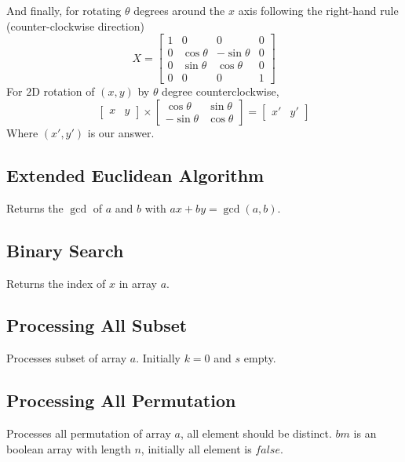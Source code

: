 \documentclass[8pt, a4paper, twocolumn]{article}
\begin{document}
And finally, for rotating $\theta$ degrees around the $x$ axis following the right-hand rule (counter-clockwise direction)
\begin{equation*}
X=\begin{bmatrix}
1 & 0 & 0 & 0\\
0 & \cos\theta & -\sin\theta & 0\\
0 & \sin\theta & \cos\theta & 0\\
0 & 0 & 0 & 1
\end{bmatrix}
\end{equation*}
For $2$D rotation of $(x,y)$ by $\theta$ degree counterclockwise,
\begin{equation*}
\begin{bmatrix}
x & y
\end{bmatrix}\times\begin{bmatrix}
\cos\theta & \sin\theta \\
-\sin\theta & \cos\theta
\end{bmatrix}=\begin{bmatrix}
x' & y'
\end{bmatrix}
\end{equation*}
Where $(x',y')$ is our answer.

\subsection{Extended Euclidean Algorithm}
Returns the $\gcd$ of $a$ and $b$ with $ax+by=\gcd(a,b)$.


\subsection{Binary Search} 
Returns the index of $x$ in array $a$.


\subsection{Processing All Subset}
Processes subset of array $a$. Initially $k=0$ and $s$ empty.


\subsection{Processing All Permutation}
Processes all permutation of array $a$, all element should be distinct. $bm$ is an boolean array with length $n$, initially all element is $false$.

\end{document}
